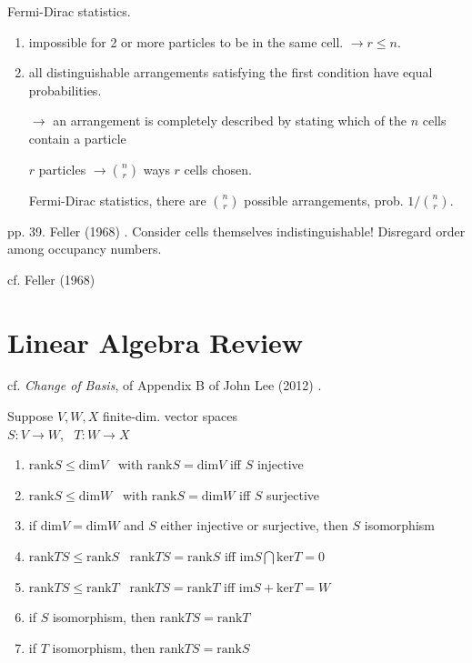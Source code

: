 \documentclass[10pt]{amsart}
\newcommand{\exercisehead}[1]
  { \smallskip
   \noindent{\small\bf Exercise #1.}
  }
\begin{document}
\begin{multicols*}{2}
\begin{enumerate}
Fermi-Dirac statistics.  
\begin{enumerate}
\item[(1)] impossible for 2 or more particles to be in the same cell.  $\to r \leq n$.  
\item[(2)] all distinguishable arrangements satisfying the first condition have equal probabilities.  

$\to$ an arrangement is completely described by stating which of the $n$ cells contain a particle  

$r$ particles $\to \binom{n}{r}$ ways $r$ cells chosen.  

Fermi-Dirac statistics, there are $\binom{n}{r}$ possible arrangements, prob. $1/\binom{n}{r}$.  
\end{enumerate}
\end{enumerate}
pp. 39.  Feller (1968)  \cite{Fell1968}.  Consider cells themselves indistinguishable!  Disregard order among occupancy numbers.  








cf. Feller (1968)  \cite{Fell1968}




\part{Linear Algebra Review}

cf. \emph{Change of Basis}, of Appendix B of  John Lee (2012) \cite{JLee2012}.  

\exercisehead{B.22} Suppose $V,W, X$ finite-dim. vector spaces \\
$S:V\to W$, \, $T:W \to X$

\begin{enumerate}
	\item[(a)] $\text{rank}S \leq \text{dim}V$ \quad \, with $\text{rank}S = \text{dim}V$ iff $S$ injective
	\item[(b)] $\text{rank}S \leq \text{dim}W$ \quad \, with $\text{rank}S = \text{dim}W$ iff $S$ surjective
	\item[(c)] if $\text{dim}V = \text{dim}W$ and $S$ either injective or surjective, then $S$ isomorphism 
	\item[(d)] $\text{rank}TS \leq \text{rank}S$ \quad \, $\text{rank}TS = \text{rank}S$ iff $\text{im}S \bigcap \text{ker}T = 0$ 
	\item[(e)] $\text{rank}TS \leq \text{rank}T$ \quad \, $\text{rank}TS = \text{rank}T$ iff $\text{im}S + \text{ker}T = W$
	\item[(f)] if $S$ isomorphism, then $\text{rank}TS = \text{rank}T$
	\item[(g)] if $T$ isomorphism, then $\text{rank}TS = \text{rank}S$
\end{enumerate}


\end{multicols*}
\end{document}
